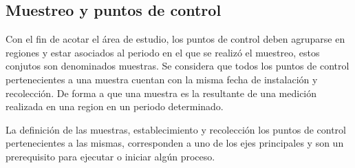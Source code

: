 \subsection{Muestreo y puntos de control}
Con el fin de acotar el área de estudio, los puntos de control deben agruparse en regiones y estar
asociados al periodo en el que se realizó el muestreo, estos conjutos son denominados muestras. Se
considera que todos los puntos de control pertenecientes a una muestra cuentan con la misma fecha
de instalación y recolección. De forma a que una muestra es la resultante de una medición realizada
en una region en un periodo determinado.

La definición de las muestras, establecimiento y recolección los puntos de control pertenecientes
a las mismas, corresponden a uno de los ejes principales y son un prerequisito para ejecutar o
iniciar algún proceso.
